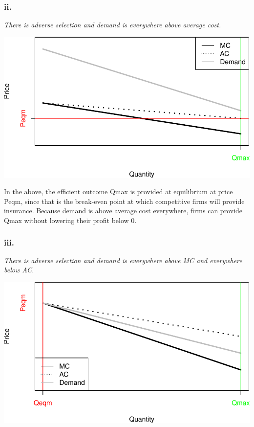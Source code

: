 \documentclass[
]{article}
\begin{document}
\hypertarget{ii.}{%
\subsubsection{ii.}\label{ii.}}

\textit{There is adverse selection and demand is everywhere above average cost.}

\includegraphics{Pset1_files/figure-latex/unnamed-chunk-3-1.pdf}

In the above, the efficient outcome Qmax is provided at equilibrium at
price Peqm, since that is the break-even point at which competitive
firms will provide insurance. Because demand is above average cost
everywhere, firms can provide Qmax without lowering their profit below
0.

\hypertarget{iii.}{%
\subsubsection{iii.}\label{iii.}}

\textit{There is adverse selection and demand is everywhere above MC and everywhere below AC.}

\includegraphics{Pset1_files/figure-latex/unnamed-chunk-4-1.pdf}
\end{document}
